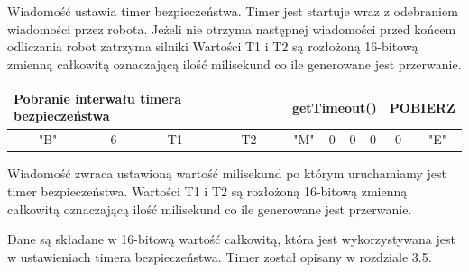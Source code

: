 \documentclass[eng,printmode]{mgr}
\begin{document}
Wiadomość ustawia timer bezpieczeństwa. Timer jest startuje wraz z odebraniem wiadomości przez robota. Jeżeli nie otrzyma następnej wiadomości przed końcem odliczania robot zatrzyma silniki
Wartości T1 i T2 są rozłożoną 16-bitową zmienną całkowitą oznaczającą ilość milisekund co ile generowane jest przerwanie.


\begin{table}[!htb]
\centering
\begin{adjustbox}{width=1\textwidth}
\label{my-label}
\begin{tabular}{|c|c|c|c|c|c|c|c|c|c|}
\hline
\multicolumn{4}{|l|}{Pobranie interwału timera bezpieczeństwa  } & \multicolumn{4}{l|}{getTimeout()} & \multicolumn{2}{l|}{POBIERZ} \\ \hline
"B" \hspace{1em}             & 6\hspace{2em}              & T1\hspace{2em}              & T2\hspace{2em}         & "M"\hspace{2em}         & 0\hspace{2em}         & 0\hspace{2em}         & 0\hspace{2em}         & 0\hspace{2em}          & "E"\hspace{2em}          \\ \hline
\end{tabular}
\end{adjustbox}
\end{table}
Wiadomość zwraca ustawioną wartość milisekund po którym uruchamiamy jest timer bezpieczeństwa.
Wartości T1 i T2 są rozłożoną 16-bitową zmienną całkowitą oznaczającą ilość milisekund co ile generowane jest przerwanie.

Dane są składane w 16-bitową wartość całkowitą, która jest wykorzystywana jest w ustawieniach timera bezpieczeństwa. Timer został opisany w rozdziale 3.5.
\end{document}
